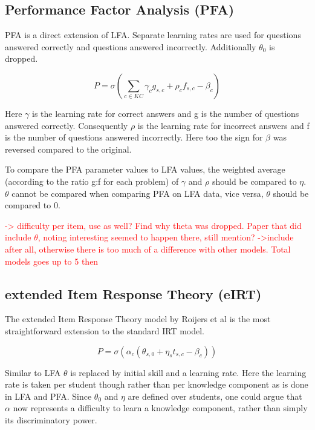 \documentclass{article}
\newcommand\todo[1]{\textcolor{red}{#1}}
\begin{document}
\subsection{Performance Factor Analysis (PFA)}
PFA is a direct extension of LFA. Separate learning rates are used for questions answered correctly and questions answered incorrectly. Additionally $\theta_{0}$ is dropped.

\begin{equation}
P = \sigma(\sum_{c \in KC}  \gamma_{c} g_{s,c} + \rho_{c} f_{s,c} - \beta_{c})
\end{equation}

Here $\gamma$ is the learning rate for correct answers and g is the number of questions answered correctly. Consequently $\rho$ is the learning rate for incorrect answers and f is the number of questions answered incorrectly. Here too the sign for $\beta$ was reversed compared to the original.

To compare the PFA parameter values to LFA values, the weighted average (according to the ratio g:f for each problem) of $\gamma$ and $\rho$ should be compared to $\eta$. $\theta$ cannot be compared when comparing PFA on LFA data, vice versa, $\theta$ should be compared to 0.

\todo{
\cite{lftransfer} -> difficulty per item, use as well? Find why theta was dropped.
Paper that did include $\theta$, noting interesting seemed to happen there, still mention? ->include after all, otherwise there is too much of a difference with other models. Total models goes up to 5 then}

\subsection{extended Item Response Theory (eIRT)}
\label{sec:eirt}
The extended Item Response Theory model by Roijers et al \cite{eirt} is the most straightforward extension to the standard IRT model.

\begin{equation}
\label{eq:eirt}
P = \sigma(\alpha_{c} (\theta_{s,0} + \eta_{s} t_{s,c} - \beta_{c}))
\end{equation}

Similar to LFA $\theta$ is replaced by initial skill and a learning rate. Here the learning rate is taken per student though rather than per knowledge component as is done in LFA and PFA. Since $\theta_{0}$ and $\eta$ are defined over students, one could argue that $\alpha$ now represents a difficulty to learn a knowledge component, rather than simply its discriminatory power.
\end{document}
